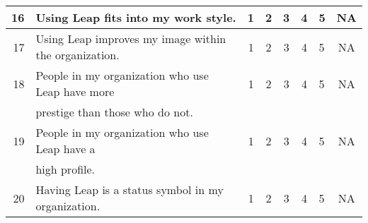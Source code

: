 \documentclass[11pt,times,dissertation,proposal]{uhthesis2e}
\begin{document}
\begin{table}[htbp]
\begin{tabular}{rlrccclc}
    \hline
    16&Using Leap fits into my work style.&1&2&3&4&5&NA\\ \hline \hline
    17&Using Leap improves my image within the organization.&1&2&3&4&5&NA\\ \hline
    18&People in my organization who use Leap have more&1&2&3&4&5&NA \\
    &prestige than those who do not.\\ \hline
    19&People in my organization who use Leap have a &1&2&3&4&5&NA \\
    &high profile. \\ \hline
    20&Having Leap is a status symbol in my organization.&1&2&3&4&5&NA\\ \hline \hline
  \end{tabular}
\end{table}
\end{document}
